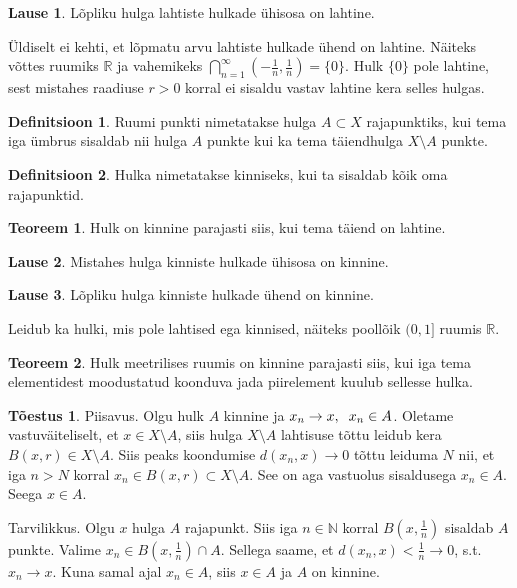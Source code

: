 \documentclass{article}[12pt]
\newcommand{\h}{\hspace{0.2cm}}
\newcommand{\R}{\mathbb{R}}
\newcommand{\N}{\mathbb{N}}
\theoremstyle{definition}
\newtheorem{definition}{Definitsioon}[section]
\theoremstyle{definition}
\newtheorem{theorem}{Teoreem}[section]
\theoremstyle{definition}
\newtheorem{lause}{Lause}[section]
\theoremstyle{break}
\newtheorem*{toestus}{Tõestus}
\begin{document}
\begin{lause}
	Lõpliku hulga lahtiste hulkade ühisosa on lahtine.
\end{lause}
Üldiselt ei kehti, et lõpmatu arvu lahtiste hulkade ühend on lahtine.
Näiteks võttes ruumiks $\R$ ja vahemikeks $\bigcap_{n=1}^\infty \left( -\frac{1}{n} ,\frac{1}{n}\right)=\{ 0 \}$.
Hulk $\{ 0 \}$ pole lahtine, sest mistahes raadiuse $r>0$ korral ei sisaldu vastav lahtine kera selles hulgas.

\begin{definition}
	Ruumi punkti nimetatakse hulga $A\subset X$ rajapunktiks, kui tema iga ümbrus sisaldab nii hulga $A$ punkte kui ka tema täiendhulga $X\setminus A$ punkte.
\end{definition}

\begin{definition}
	Hulka nimetatakse kinniseks, kui ta sisaldab kõik oma rajapunktid.
\end{definition}

\begin{theorem}
	Hulk on kinnine parajasti siis, kui tema täiend on lahtine.
\end{theorem}

\begin{lause}
	Mistahes hulga kinniste hulkade ühisosa on kinnine.
\end{lause}

\begin{lause}
	Lõpliku hulga kinniste hulkade ühend on kinnine.
\end{lause}

Leidub ka hulki, mis pole lahtised ega kinnised, näiteks poollõik $(0,1]$ ruumis $\R$.

\begin{theorem}
	Hulk meetrilises ruumis on kinnine parajasti siis, kui iga tema elementidest moodustatud koonduva jada piirelement kuulub sellesse hulka.
\end{theorem}
\begin{toestus}
	Piisavus.
	Olgu hulk $A$ kinnine ja $x_n\rightarrow x,\h x_n\in A$.
	Oletame vastuväiteliselt, et $x\in X\setminus A$, siis hulga $X\setminus A$ lahtisuse tõttu leidub kera $B(x,r)\in X\setminus A$.
	Siis peaks koondumise $d(x_n,x)\rightarrow 0$ tõttu leiduma $N$ nii, et iga $n>N$ korral $x_n\in B(x,r)\subset X\setminus A$.
	See on aga vastuolus sisaldusega $x_n\in A$.
	Seega $x\in A$.

	Tarvilikkus. Olgu $x$ hulga $A$ rajapunkt.
	Siis iga $n\in\N$ korral $B(x,\frac{1}{n})$ sisaldab $A$ punkte. 
	Valime $x_n\in B(x,\frac{1}{n})\cap A$.
	Sellega saame, et $d(x_n,x)<\frac{1}{n}\rightarrow 0$, s.t. $x_n\rightarrow x$.
	Kuna samal ajal $x_n\in A$, siis $x\in A$ ja $A$ on kinnine.
\end{toestus}
\end{document}
